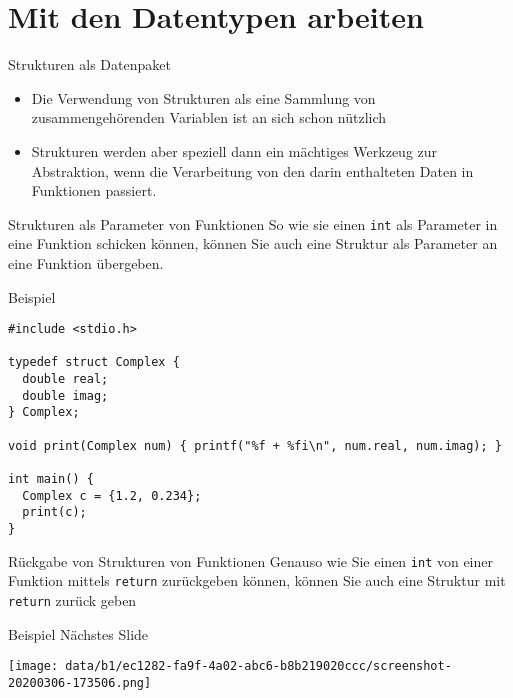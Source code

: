 \documentclass[presentation]{beamer}
\begin{document}
\section{Mit den Datentypen arbeiten}
\label{sec:orga08b4df}
\begin{frame}[label={sec:org8fe9f79}]{Strukturen als Datenpaket}
\begin{itemize}
\item Die Verwendung von Strukturen als \alert{eine Sammlung von
zusammengehörenden Variablen} ist an sich schon nützlich
\item Strukturen werden aber speziell dann ein mächtiges Werkzeug zur
Abstraktion, wenn die Verarbeitung von den darin enthalteten Daten
in Funktionen passiert.
\end{itemize}
\end{frame}
\begin{frame}[label={sec:orgc4c90a8},fragile]{Strukturen als Parameter von Funktionen}
 So wie sie einen {\color{solarizedYellow}\verb!int!} als Parameter in eine Funktion schicken können,
können Sie auch eine Struktur als Parameter an eine Funktion
übergeben.
\begin{exampleblock}{Beispiel}
\begin{verbatim}
#include <stdio.h>

typedef struct Complex {
  double real;
  double imag;
} Complex;

void print(Complex num) { printf("%f + %fi\n", num.real, num.imag); }

int main() {
  Complex c = {1.2, 0.234};
  print(c);
}
\end{verbatim}
\end{exampleblock}
\end{frame}
\begin{frame}[label={sec:orgcb0f6ab},fragile]{Rückgabe von Strukturen von Funktionen}
 Genauso wie Sie einen {\color{solarizedYellow}\verb!int!} von einer Funktion mittels {\color{solarizedYellow}\verb!return!}
zurückgeben können, können Sie auch eine Struktur mit {\color{solarizedYellow}\verb!return!} zurück
geben
\begin{exampleblock}{Beispiel}
\center
Nächstes Slide
\begin{center}
\texttt{[image: data/b1/ec1282-fa9f-4a02-abc6-b8b219020ccc/screenshot-20200306-173506.png]}
\end{center}
\end{exampleblock}
\end{frame}
\end{document}
